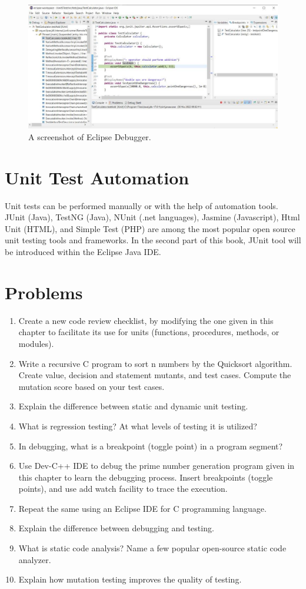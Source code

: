 \begin{figure}[!ht]
    \includegraphics{images/eclipse-debugger-screenshot.jpg}
    \caption{A screenshot of Eclipse Debugger.}
\end{figure}

\section{Unit Test Automation}
Unit tests can be performed manually or with the help of automation tools. JUnit (Java), TestNG (Java), NUnit (.net languages), Jasmine (Javascript), Html Unit (HTML), and Simple Test (PHP) are among the most popular open source unit testing tools and frameworks. In the second part of this book, JUnit tool will be introduced within the Eclipse Java IDE.  

\section{Problems}
\begin{enumerate}
    \item Create a new code review checklist, by modifying the one given in this chapter to facilitate its use for units (functions, procedures, methods, or modules). 
    \item Write a recursive C program to sort n numbers by the Quicksort algorithm. Create value, decision and statement mutants, and test cases. Compute the mutation score based on your test cases.  
    \item Explain the difference between static and dynamic unit testing.
    \item What is regression testing? At what levels of testing it is utilized?
    \item In debugging, what is a breakpoint (toggle point) in a program segment?
    \item Use Dev-C++ IDE to debug the prime number generation program given in this chapter to learn the debugging process. Insert breakpoints (toggle points), and use add watch facility to trace the execution.
    \item Repeat the same using an Eclipse IDE for C programming language.
    \item Explain the difference between debugging and testing.
    \item What is static code analysis? Name a few popular open-source static code analyzer.
    \item Explain how mutation testing improves the quality of testing.
    
\end{enumerate}